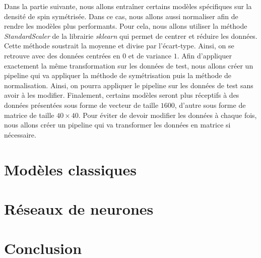 \documentclass[11pt]{scrartcl} %
\begin{document}
Dans la partie suivante, nous allons entraîner certains modèles spécifiques sur la densité de spin symétrisée. Dans ce cas, nous allons aussi normaliser afin de rendre les modèles plus performants.
Pour cela, nous allons utiliser la méthode \textit{StandardScaler} de la librairie \textit{sklearn} qui permet de centrer et réduire les données. Cette méthode soustrait la moyenne et divise par l'écart-type. Ainsi, on se retrouve avec des données centrées en $0$ et de variance $1$.
Afin d'appliquer exactement la même transformation sur les données de test, nous allons créer un pipeline qui va appliquer la méthode de symétrisation puis la méthode de normalisation. Ainsi, on pourra appliquer le pipeline sur les données de test sans avoir à les modifier.
Finalement, certains modèles seront plus réceptifs à des données présentées sous forme de vecteur de taille $1600$, d'autre sous forme de matrice de taille $40 \times 40$. Pour éviter de devoir modifier les données à chaque fois, nous allons créer un pipeline qui va transformer les données en  matrice si nécessaire.

\section{Modèles classiques}

\section{Réseaux de neurones}

\section*{Conclusion}
\end{document}
